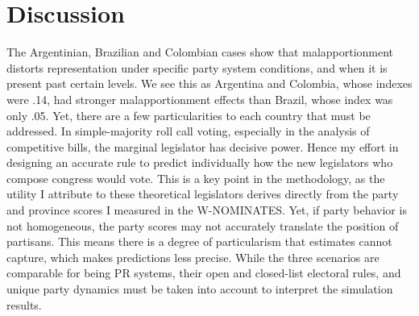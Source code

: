 \documentclass[a4paper,12pt]{article}
\begin{document}


\section{Discussion}
\label{sec:discussion}

The Argentinian, Brazilian and Colombian cases show that malapportionment distorts representation under specific party system conditions, and when it is present past certain levels. %
We see this as Argentina and Colombia, whose indexes were .14, had stronger malapportionment effects than Brazil, whose index was only .05. Yet, there are a few particularities to each country that must be addressed. In simple-majority roll call voting, especially in the analysis of competitive bills, the marginal legislator has decisive power. Hence my effort in designing an accurate rule to predict individually how the new legislators who compose congress would vote. This is a key point in the methodology, as the utility I attribute to these theoretical legislators derives directly from the party and province scores I measured in the W-NOMINATES. Yet, if party behavior is not homogeneous, the party scores may not accurately translate the position of partisans. This means there is a degree of particularism that estimates cannot capture, which makes predictions less precise. While the three scenarios are comparable for being PR systems, their open and closed-list electoral rules, and unique party dynamics must be taken into account to interpret the simulation results. 
\end{document}
